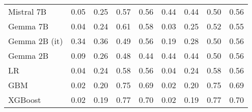 \begin{tabular}{lllllllll}
Mistral 7B & \cellcolor{cyan!22.5} 0.05 & \cellcolor{cyan!14.2} 0.25 & 0.57 & 0.56 & \cellcolor{orange!25.0} 0.44 & \cellcolor{orange!25.0} 0.44 & 0.50 & 0.56 \\
Gemma 7B & \cellcolor{cyan!25.0} 0.04 & \cellcolor{cyan!19.0} 0.24 & 0.61 & 0.58 & \cellcolor{cyan!25.0} 0.03 & \cellcolor{cyan!13.7} 0.25 & 0.52 & 0.55 \\
Gemma 2B (it) & 0.34 & 0.36 & \cellcolor{orange!9.3} 0.49 & 0.56 & 0.19 & 0.28 & 0.50 & 0.56 \\
Gemma 2B & 0.09 & \cellcolor{cyan!4.7} 0.26 & \cellcolor{orange!25.0} 0.48 & \cellcolor{orange!25.0} 0.44 & \cellcolor{orange!25.0} 0.44 & \cellcolor{orange!25.0} 0.44 & 0.50 & 0.56 \\
LR & 0.04 & 0.24 & 0.58 & 0.56 & 0.04 & 0.24 & 0.58 & 0.56 \\
GBM & 0.02 & 0.20 & 0.75 & 0.69 & 0.02 & 0.20 & 0.75 & 0.69 \\
XGBoost & 0.02 & 0.19 & 0.77 & 0.70 & 0.02 & 0.19 & 0.77 & 0.70 \\
\bottomrule
\end{tabular}

